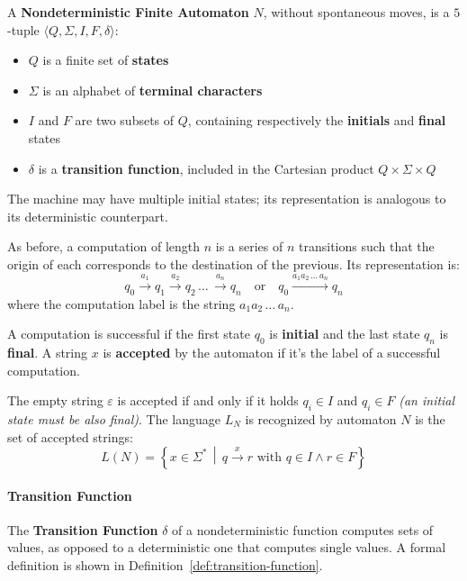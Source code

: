 \documentclass[english]{article}
\begin{document}
\begin{definition}
  \label{def:nondeterministic-finite-automaton}
  A \textbf{Nondeterministic Finite Automaton} \(N\), without spontaneous moves, is a \(5\)-tuple \(\langle Q, \Sigma, I, F, \delta \rangle\):

  \begin{itemize}
    \item \(Q\) is a finite set of \textbf{states}
    \item \(\Sigma\) is an alphabet of \textbf{terminal characters}
    \item \(I\) and \(F\) are two subsets of \(Q\), containing respectively the \textbf{initials} and \textbf{final} states
    \item \(\delta\) is a \textbf{transition function}, included in the Cartesian product \(Q \times \Sigma \times Q\)
  \end{itemize}

  The machine may have multiple initial states;
  its representation is analogous to its deterministic counterpart.
\end{definition}

As before, a computation of length \(n\) is a series of \(n\) transitions such that the origin of each corresponds to the destination of the previous. Its representation is:
\[ q_0 \xrightarrow{a_1} q_1 \xrightarrow{a_2} q_2 \,\ldots\, \xrightarrow{a_n} q_n \quad \text{or} \quad q_0 \xrightarrow{a_1 a_2 \,\ldots\, a_n} q_n \]
where the computation label is the string \(a_1 a_2 \,\ldots\, a_n\).

A computation is successful if the first state \(q_0\) is \textbf{initial} and the last state \(q_n\) is \textbf{final}.
A string \(x\) is \textbf{accepted} by the automaton if it's the label of a successful computation.

The empty string \(\varepsilon\) is accepted if and only if it holds \(q_i \in I\) and \(q_i \in F\) \textit{(an initial state must be also final)}.
The language \(L_N\) is recognized by automaton \(N\) is the set of accepted strings:
\[ L(N) = \left\{ x \in \Sigma^\ast \, \middle\vert \, q \xrightarrow{x} r \text{ with } q \in I \land r \in F \right\} \]

\paragraph{Transition Function}

The \textbf{Transition Function} \(\delta\) of a nondeterministic function computes sets of values, as opposed to a deterministic one that computes single values.
A formal definition is shown in Definition~\ref{def:transition-function}.
\end{document}
